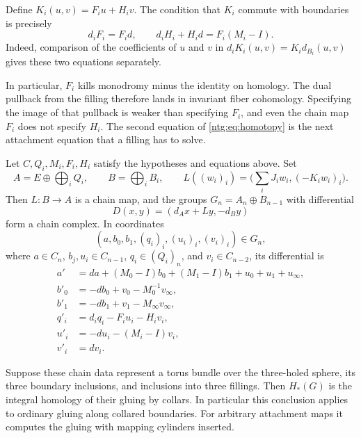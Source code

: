 Define
$K_i(u,v)=F_iu+H_iv$. The condition that $K_i$ commute with
boundaries is precisely
\begin{equation}\label{ntg:eq:homotopy}
 d_iF_i=F_id,\qquad d_iH_i+H_id=F_i(M_i-I).
\end{equation}
Indeed, comparison of the coefficients of $u$ and $v$ in
$d_iK_i(u,v)=K_id_{B_i}(u,v)$ gives these two equations separately.

In particular, $F_i$ kills monodromy minus the identity on homology.
The dual pullback from the filling therefore lands in invariant fiber
cohomology. Specifying the image of that pullback is weaker than
specifying $F_i$, and even the chain map $F_i$ does not specify $H_i$.
The second equation of \eqref{ntg:eq:homotopy} is the next attachment
equation that a filling has to solve.

\begin{theorem}\label{ntg:thm:gluing}
Let $C,Q_i,M_i,F_i,H_i$ satisfy the hypotheses and equations above.
Set
\[
 A=E\oplus\bigoplus_iQ_i,\qquad B=\bigoplus_i B_i,
 \qquad L((w_i)_i)=\bigl(\textstyle\sum_iJ_iw_i,(-K_iw_i)_i\bigr).
\]
Then $L:B\to A$ is a chain map, and the groups
$G_n=A_n\oplus B_{n-1}$ with differential
\begin{equation}\label{ntg:eq:cone}
 D(x,y)=(d_Ax+Ly,-d_By)
\end{equation}
form a chain complex. In coordinates
\[
 (a,b_0,b_1,(q_i)_i,(u_i)_i,(v_i)_i)\in G_n,
\]
where $a\in C_n$, $b_j,u_i\in C_{n-1}$,
$q_i\in(Q_i)_n$, and $v_i\in C_{n-2}$, its differential is
\begin{equation}\label{ntg:eq:full-boundary}
\begin{aligned}
 a'&=da+(M_0-I)b_0+(M_1-I)b_1+u_0+u_1+u_\infty,\\
 b'_0&=-db_0+v_0-M_0^{-1}v_\infty,\\
 b'_1&=-db_1+v_1-M_\infty v_\infty,\\
 q'_i&=d_iq_i-F_iu_i-H_iv_i,\\
 u'_i&=-du_i-(M_i-I)v_i,\\
 v'_i&=dv_i.
\end{aligned}
\end{equation}

Suppose these chain data represent a torus bundle over the three-holed
sphere, its three boundary inclusions, and inclusions into three fillings.
Then $H_*(G)$ is the integral homology of their gluing by collars. In particular this conclusion applies to ordinary gluing
along collared boundaries. For arbitrary attachment maps it computes
the gluing with mapping cylinders inserted.
\end{theorem}

